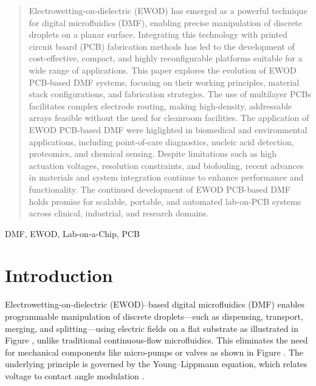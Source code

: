 \documentclass[conference,a4paper]{IEEEtran}
\begin{document}
\begin{abstract}
Electrowetting-on-dielectric (EWOD) has emerged as a powerful technique for digital microfluidics (DMF), enabling precise manipulation of discrete droplets on a planar surface. Integrating this technology with printed circuit board (PCB) fabrication methods has led to the development of cost-effective, compact, and highly reconfigurable platforms suitable for a wide range of applications. This paper explores the evolution of EWOD PCB-based DMF systems, focusing on their working principles, material stack configurations, and fabrication strategies. The use of multilayer PCBs facilitates complex electrode routing, making high-density, addressable arrays feasible without the need for cleanroom facilities. The application of EWOD PCB-based DMF were higlighted in biomedical and environmental applications, including point-of-care diagnostics, nucleic acid detection, proteomics, and chemical sensing. Despite limitations such as high actuation voltages, resolution constraints, and biofouling, recent advances in materials and system integration continue to enhance performance and functionality. The continued development of EWOD PCB-based DMF holds promise for scalable, portable, and automated lab-on-PCB systems across clinical, industrial, and research domains.
\end{abstract}

\begin{IEEEkeywords}
DMF, EWOD, Lab-on-a-Chip, PCB
\end{IEEEkeywords}

\section{Introduction}
Electrowetting-on-dielectric (EWOD)–based digital microfluidics (DMF) enables programmable manipulation of discrete droplets—such as dispensing, transport, merging, and splitting—using electric fields on a flat substrate as illustrated in Figure , unlike traditional continuous-flow microfluidics. This eliminates the need for mechanical components like micro-pumps or valves as shown in Figure . The underlying principle is governed by the Young–Lippmann equation, which relates voltage to contact angle modulation \cite{kimPCBbasedDigitalMicrofluidic2024}.
\end{document}
